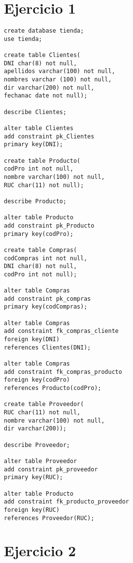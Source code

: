 \documentclass[a4paper,12pt]{article}
\begin{document}
\section{Ejercicio 1}

\begin{lstlisting}
create database tienda;
use tienda;

create table Clientes(
DNI char(8) not null,
apellidos varchar(100) not null,
nombres varchar (100) not null,
dir varchar(200) not null,
fechanac date not null);

describe Clientes;

alter table Clientes
add constraint pk_Clientes
primary key(DNI);

create table Producto(
codPro int not null,
nombre varchar(100) not null,
RUC char(11) not null);

describe Producto;

alter table Producto
add constraint pk_Producto
primary key(codPro);

create table Compras(
codCompras int not null,
DNI char(8) not null,
codPro int not null);

alter table Compras
add constraint pk_compras
primary key(codCompras);

alter table Compras
add constraint fk_compras_cliente
foreign key(DNI)
references Clientes(DNI);

alter table Compras
add constraint fk_compras_producto
foreign key(codPro)
references Producto(codPro);

create table Proveedor(
RUC char(11) not null,
nombre varchar(100) not null,
dir varchar(200));

describe Proveedor;

alter table Proveedor
add constraint pk_proveedor
primary key(RUC);

alter table Producto
add constraint fk_producto_proveedor
foreign key(RUC)
references Proveedor(RUC);
\end{lstlisting}

\section{Ejercicio 2}
\end{document}
